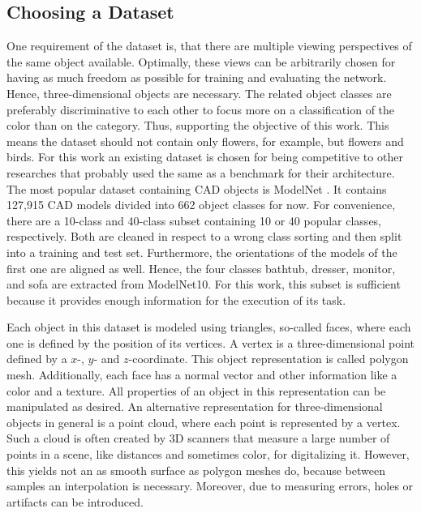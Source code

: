 \subsection{Choosing a Dataset}
\label{sec:dataset-choosing}
One requirement of the dataset is, that there are multiple viewing perspectives of the same object available.
Optimally, these views can be arbitrarily chosen for having as much freedom as possible for training and evaluating the network.
Hence, three-dimensional objects are necessary.
The related object classes are preferably discriminative to each other to focus more on a classification of the color than on the category.
Thus, supporting the objective of this work.
This means the dataset should not contain only flowers, for example, but flowers and birds.
For this work an existing dataset is chosen for being competitive to other researches that probably used the same as a benchmark for their architecture.
The most popular dataset containing CAD objects is ModelNet \cite{conf/cvpr/WuSKYZTX15}.
It contains 127,915 CAD models divided into 662 object classes for now.
For convenience, there are a 10-class and 40-class subset containing 10 or 40 popular classes, respectively.
Both are cleaned in respect to a wrong class sorting and then split into a training and test set.
Furthermore, the orientations of the models of the first one are aligned as well.
Hence, the four classes bathtub, dresser, monitor, and sofa are extracted from ModelNet10.
For this work, this subset is sufficient because it provides enough information for the execution of its task.

Each object in this dataset is modeled using triangles, so-called faces, where each one is defined by the position of its vertices.
A vertex is a three-dimensional point defined by a $x$-, $y$- and $z$-coordinate.
This object representation is called polygon mesh.
Additionally, each face has a normal vector and other information like a color and a texture.
All properties of an object in this representation can be manipulated as desired.
An alternative representation for three-dimensional objects in general is a point cloud, where each point is represented by a vertex.
Such a cloud is often created by 3D scanners that measure a large number of points in a scene, like distances and sometimes color, for digitalizing it.
However, this yields not an as smooth surface as polygon meshes do, because between samples an interpolation is necessary.
Moreover, due to measuring errors, holes or artifacts can be introduced.